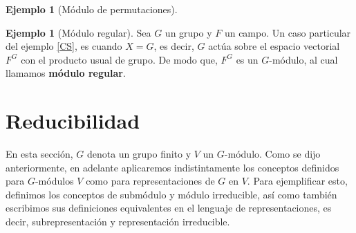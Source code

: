 \documentclass[12pt]{book}
\theoremstyle{definition}
\newtheorem{example}[theorem]{Ejemplo}
\newcounter{in}
\newcounter{ini}
\begin{document}
\begin{example}[Módulo de permutaciones]
\end{example}

\begin{example}[Módulo regular]
  \label{regular}
  Sea $G$ un grupo y $F$ un campo. Un caso particular del ejemplo
  \ref{CS}, es cuando $X=G$, es decir, $G$ actúa sobre el espacio
  vectorial $F^{G}$ con el producto usual de grupo.
De modo que, $F^{G}$ es un $G$-módulo, al cual llamamos \textbf{módulo regular}.  
\end{example}

\section{Reducibilidad}
\label{reducibilidad}

En esta sección, $G$ denota un grupo finito y $V$ un $G$-módulo. Como
se dijo anteriormente, en adelante aplicaremos indistintamente los
conceptos definidos para $G$-módulos $V$ como para representaciones de
$G$ en $V$. Para ejemplificar esto, definimos los conceptos de
submódulo y módulo irreducible, así como también
escribimos sus definiciones equivalentes en el lenguaje de
representaciones, es decir, subrepresentación y representación
irreducible.
\end{document}
